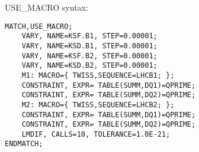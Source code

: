USE\_MACRO syntax:

\begin{verbatim}
MATCH,USE_MACRO;
    VARY, NAME=KSF.B1, STEP=0.00001;
    VARY, NAME=KSD.B1, STEP=0.00001;
    VARY, NAME=KSF.B2, STEP=0.00001;
    VARY, NAME=KSD.B2, STEP=0.00001;
    M1: MACRO={ TWISS,SEQUENCE=LHCB1; };
    CONSTRAINT, EXPR= TABLE(SUMM,DQ1)=QPRIME;
    CONSTRAINT, EXPR= TABLE(SUMM,DQ2)=QPRIME;
    M2: MACRO={ TWISS,SEQUENCE=LHCB2; };
    CONSTRAINT, EXPR= TABLE(SUMM,DQ1)=QPRIME;
    CONSTRAINT, EXPR= TABLE(SUMM,DQ2)=QPRIME;
    LMDIF, CALLS=10, TOLERANCE=1.0E-21;
ENDMATCH;
\end{verbatim}


